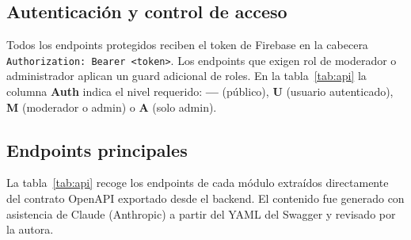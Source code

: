 \subsection{Autenticación y control de acceso}

Todos los endpoints protegidos reciben el token de Firebase en la cabecera \texttt{Authorization: Bearer <token>}. Los endpoints que exigen rol de moderador o administrador aplican un guard adicional de roles. En la tabla~\ref{tab:api} la columna \textbf{Auth} indica el nivel requerido: \textbf{—} (público), \textbf{U} (usuario autenticado), \textbf{M} (moderador o admin) o \textbf{A} (solo admin).

\subsection{Endpoints principales}

La tabla~\ref{tab:api} recoge los endpoints de cada módulo extraídos directamente del contrato OpenAPI exportado desde el backend. El contenido fue generado con asistencia de Claude (Anthropic) a partir del YAML del Swagger y revisado por la autora.

